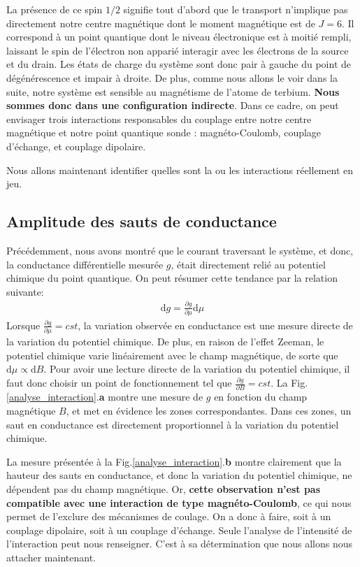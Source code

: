 La présence de ce spin $1/2$ signifie tout d'abord que le transport n'implique pas directement notre centre magnétique dont le moment magnétique est de $J=6$. Il correspond à un point quantique dont le niveau électronique est à moitié rempli, laissant le spin de l'électron non apparié interagir avec les électrons de la source et du drain. Les états de charge du système sont donc pair à gauche du point de dégénérescence et impair à droite. De plus, comme nous allons le voir dans la suite, notre système est sensible au magnétisme de l'atome de terbium. \textbf{Nous sommes donc dans une configuration indirecte}. Dans ce cadre, on peut envisager trois interactions responsables du couplage entre notre centre magnétique et notre point quantique sonde : magnéto-Coulomb, couplage d'échange, et couplage dipolaire.

Nous allons maintenant identifier quelles sont la ou les interactions réellement en jeu.

\subsection{Amplitude des sauts de conductance}
Précédemment, nous avons montré que le courant traversant le système, et donc, la conductance différentielle mesurée $g$, était directement relié au potentiel chimique du point quantique. On peut résumer cette tendance par la relation suivante:
\begin{eqnarray}
\text{d}g = \frac{\partial g}{\partial \mu} \text{d} \mu
\end{eqnarray}
Lorsque $\frac{\partial g}{\partial \mu} = cst$, la variation observée en conductance est une mesure directe de la variation du potentiel chimique. De plus, en raison de l'effet Zeeman, le potentiel chimique varie linéairement avec le champ magnétique, de sorte que $\text{d}\mu \propto \text{d}B$. Pour avoir une lecture directe de la variation du potentiel chimique, il faut donc choisir un point de fonctionnement tel que $\frac{\partial g}{\partial B} = cst$. La Fig.\ref{analyse_interaction}.\textbf{a} montre une mesure de $g$ en fonction du champ magnétique $B$, et met en évidence les zones correspondantes. Dans ces zones, un saut en conductance est directement proportionnel à la variation du potentiel chimique. 

La mesure présentée à la Fig.\ref{analyse_interaction}.\textbf{b} montre clairement que la hauteur des sauts en conductance, et donc la variation du potentiel chimique, ne dépendent pas du champ magnétique. Or, \textbf{cette observation n'est pas compatible avec une interaction de type magnéto-Coulomb}, ce qui nous permet de l'exclure des mécanismes de coulage. On a donc à faire, soit à un couplage dipolaire, soit à un couplage d'échange. Seule l'analyse de l'intensité de l'interaction peut nous renseigner. C'est à sa détermination que nous allons nous attacher maintenant.

